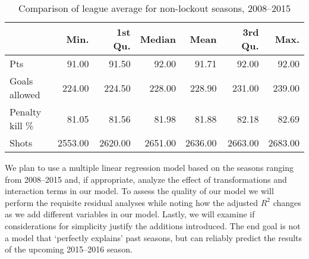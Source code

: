 \documentclass[12pt]{report}
\begin{document}
\begin{table}[ht]
\centering
\begin{tabular}{lrrrrrr}
  \hline
 & Min. & 1st Qu. & Median & Mean & 3rd Qu. & Max. \\ 
  \hline
Pts & 91.00 & 91.50 & 92.00 & 91.71 & 92.00 & 92.00 \\ 
  Goals allowed & 224.00 & 224.50 & 228.00 & 228.90 & 231.00 & 239.00 \\ 
  Penalty kill \% & 81.05 & 81.56 & 81.98 & 81.88 & 82.18 & 82.69 \\ 
  Shots & 2553.00 & 2620.00 & 2651.00 & 2636.00 & 2663.00 & 2683.00 \\ 
   \hline
\end{tabular}
\caption{Comparison of league average for non-lockout seasons, 2008--2015} 
\end{table}
We plan to use a multiple linear regression model based on the seasons ranging from 2008--2015 and, if appropriate, analyze the effect of transformations and  interaction terms in our model. To assess the quality of our model we will perform the requisite residual analyses while noting how the adjusted $R^{2}$ changes as we add different variables in our model. Lastly, we will examine if considerations for simplicity justify the additions introduced. The end goal is not a model  that `perfectly explains' past seasons, but can reliably predict the results of the upcoming 2015--2016 season. 
\end{document}
